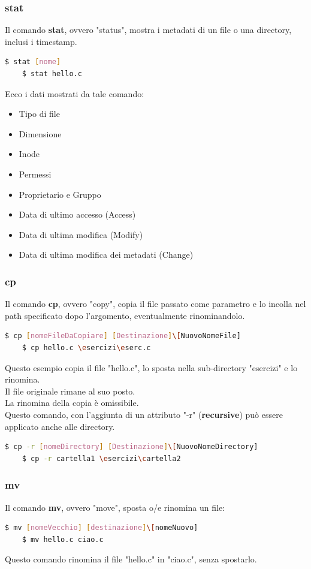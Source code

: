 \documentclass[12pt,a4paper]{article}
\begin{document}
\subsubsection{stat}
Il comando \textbf{stat}, ovvero "status", mostra i metadati di un file o una directory, inclusi i timestamp.
\begin{lstlisting}[language=bash]
    $ stat [nome]
    $ stat hello.c
\end{lstlisting}
Ecco i dati mostrati da tale comando:
\begin{itemize}
    \item Tipo di file
    \item Dimensione
    \item Inode
    \item Permessi
    \item Proprietario e Gruppo
    \item Data di ultimo accesso (Access)
    \item Data di ultima modifica (Modify)
    \item Data di ultima modifica dei metadati (Change)
\end{itemize}
\subsubsection{cp}
Il comando \textbf{cp}, ovvero "copy", copia il file passato come parametro e lo incolla nel path specificato dopo l'argomento, eventualmente rinominandolo.
\begin{lstlisting}[language=bash]
    $ cp [nomeFileDaCopiare] [Destinazione]\[NuovoNomeFile]
    $ cp hello.c \esercizi\eserc.c
\end{lstlisting}
Questo esempio copia il file "hello.c", lo sposta nella sub-directory "esercizi" e lo rinomina.\\
Il file originale rimane al suo posto.\\
La rinomina della copia è omissibile.\\
Questo comando, con l'aggiunta di un attributo "-r" (\textbf{recursive}) può essere applicato anche alle directory.
\begin{lstlisting}[language=bash]
    $ cp -r [nomeDirectory] [Destinazione]\[NuovoNomeDirectory]
    $ cp -r cartella1 \esercizi\cartella2
\end{lstlisting}
\subsubsection{mv}
Il comando \textbf{mv}, ovvero "move", sposta o/e rinomina un file:
\begin{lstlisting}[language=bash]
    $ mv [nomeVecchio] [destinazione]\[nomeNuovo]
    $ mv hello.c ciao.c
\end{lstlisting}
Questo comando rinomina il file "hello.c" in "ciao.c", senza spostarlo.
\end{document}
